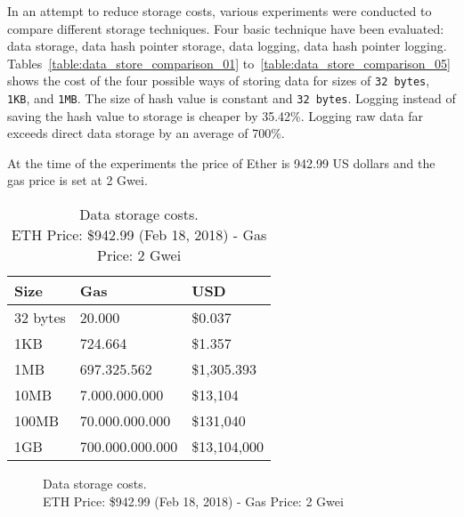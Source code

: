 In an attempt to reduce storage costs, various experiments were conducted to compare different storage techniques. Four basic technique have been evaluated: data storage, data hash pointer storage, data logging, data hash pointer logging. Tables~\ref{table:data_store_comparison_01} to~\ref{table:data_store_comparison_05} shows the cost of the four possible ways of storing data for sizes of \verb|32 bytes|, \verb|1KB|, and \verb|1MB|. The size of hash value is constant and \verb|32 bytes|. Logging instead of saving the hash value to storage is cheaper by 35.42\%. Logging raw data far exceeds direct data storage by an average of 700\%.

At the time of the experiments the price of Ether is 942.99 US dollars and the gas price is set at 2 Gwei.

\begin{table}[!htb]
\centering
\caption[Data storage costs]{Data storage costs.\\ ETH Price: \$942.99 (Feb 18, 2018) - Gas Price: 2 Gwei}
\begin{tabular}{|l|l|l|}
\hline
 Size & Gas  & USD \\ \hline
 32 bytes & 20.000  & \$0.037 \\ \hline
 1KB & 724.664  & \$1.357 \\ \hline
 1MB & 697.325.562  & \$1,305.393 \\ \hline
 10MB & 7.000.000.000  & \$13,104 \\ \hline
 100MB & 70.000.000.000  & \$131,040 \\ \hline
 1GB & 700.000.000.000  & \$13,104,000 \\ \hline
\end{tabular}
\captionsetup{format=hang, justification=centering}
\label{table:bytes_usd_cost}
\end{table}

\begin{figure}[!htb]
  \centering
  \captionsetup{format=hang, justification=centering}
  \caption[Data storage costs]{Data storage costs.\\ ETH Price: \$942.99 (Feb 18, 2018) - Gas Price: 2 Gwei}
  \label{fig:bytes_usd_cost}
\end{figure}

